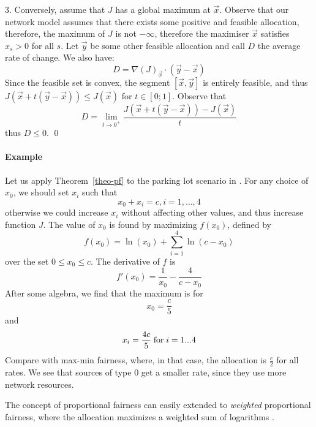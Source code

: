 3. Conversely, assume that $J$ has a global maximum at $\vec{x}$.
Observe that our network model assumes that there exists some positive and feasible allocation, therefore, the maximum of $J$ is not $-\infty$, therefore the maximiser $\vec{x}$ satisfies $x_s>0$ for all $s$. Let $\vec{y}$ be some other feasible allocation and call $D$ the
average rate of change. We also have:
$$ D = \nabla(J)_{\vec{x}}\cdot (\vec{y}-\vec{x}) $$
Since the feasible set is convex, the segment $[\vec{x},
\vec{y}]$ is entirely feasible, and thus $J(\vec{x} + t (\vec{y}-\vec{x})) \leq  J(\vec{x} )$ for $t\in [0;1]$. Observe that
$$D = \lim_{t \rightarrow 0^+}
\frac{J(\vec{x} + t (\vec{y}-\vec{x})) - J(\vec{x} ) }{ t}
$$
thus $D \leq 0$. \qed
\paragraph{Example}
Let us apply Theorem~\ref{theo-pf} to the parking lot
scenario in . For any choice of $x_{0}$, we should set $x_{i}$
such that
$$
x_{0} + x_{i} = c,  i=1,\ldots,4
$$
otherwise we could increase $x_{i}$ without affecting other
values, and thus increase function $J$. The value of $x_{0}$
is found by maximizing $f(x_{0})$, defined by
$$
f(x_{0}) =  \ln(x_{0}) + \sum_{i=1}^4  \ln(c
-x_{0})
$$
over the set $0 \leq x_{0} \leq c$. The
derivative of $f$ is
$$
f'(x_{0}) =\frac{1}{x_{0}} - \frac{4}{ c- x_{0}}
$$
After some algebra, we find that the maximum is for
$$
x_{0}= \frac{c}{5}
$$
and
$$
x_{i}= \frac{4c}{5}\mathrm{\; for \; } i=1...4
$$
Compare with max-min fairness, where, in that case, the
allocation is $\frac{c}{2}$ for all rates.  We see that
sources of type $0$ get a smaller rate, since they use more
network resources.

The concept of proportional fairness can easily extended to
\emph{weighted} proportional fairness, where the allocation
maximizes a weighted sum of logarithms \cite{KMT97}.


